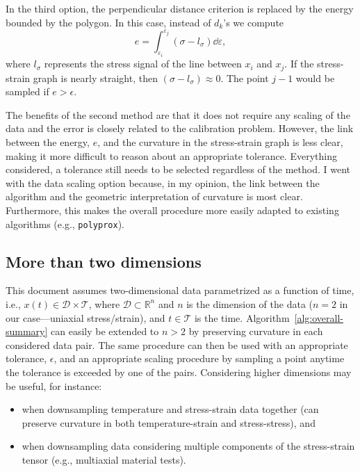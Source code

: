 \documentclass[a4paper,11pt]{article}
\begin{document}
In the third option, the perpendicular distance criterion is replaced by the energy bounded by the polygon.
In this case, instead of $d_k$'s we compute
\begin{equation*}
    e = \int_{\varepsilon_i}^{\varepsilon_j} (\sigma - l_\sigma) \dd \varepsilon,
\end{equation*}
where $l_\sigma$ represents the stress signal of the line between $x_i$ and $x_j$.
If the stress-strain graph is nearly straight, then $(\sigma - l_\sigma) \approx 0$.
The point $j-1$ would be sampled if $e > \epsilon$.

The benefits of the second method are that it does not require any scaling of the data and the error is closely related to the calibration problem.
However, the link between the energy, $e$, and the curvature in the stress-strain graph is less clear, making it more difficult to reason about an appropriate tolerance.
Everything considered, a tolerance still needs to be selected regardless of the method.
I went with the data scaling option because, in my opinion, the link between the algorithm and the geometric interpretation of curvature is most clear.
Furthermore, this makes the overall procedure more easily adapted to existing algorithms (e.g., \texttt{polyprox}).

\subsection{More than two dimensions}

This document assumes two-dimensional data parametrized as a function of time, i.e., $x(t) \in \mathcal{D} \times \mathcal{T}$, where $\mathcal{D} \subset \mathbb{R}^n$ and $n$ is the dimension of the data ($n = 2$ in our case---uniaxial stress/strain), and $t \in \mathcal{T}$ is the time.
Algorithm~\ref{alg:overall-summary} can easily be extended to $n > 2$ by preserving curvature in each considered data pair.
The same procedure can then be used with an appropriate tolerance, $\epsilon$, and an appropriate scaling procedure by sampling a point anytime the tolerance is exceeded by one of the pairs.
Considering higher dimensions may be useful, for instance:
\begin{itemize}
    \item when downsampling temperature and stress-strain data together (can preserve curvature in both temperature-strain and stress-stress), and
    \item when downsampling data considering multiple components of the stress-strain tensor (e.g., multiaxial material tests).
\end{itemize}
\end{document}
